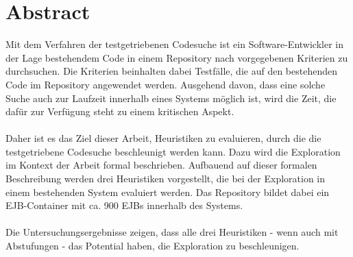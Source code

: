 \documentclass[a4paper,12pt]{book}
\begin{document}
\frontmatter

\section*{Abstract}
Mit dem Verfahren der testgetriebenen Codesuche ist ein Software-Entwickler in der Lage bestehendem Code in einem Repository nach vorgegebenen Kriterien zu durchsuchen. Die Kriterien beinhalten dabei Testfälle, die auf den bestehenden Code im Repository angewendet werden.  Ausgehend davon, dass eine solche Suche auch zur Laufzeit innerhalb eines Systems möglich ist, wird die Zeit, die dafür zur Verfügung steht zu einem kritischen Aspekt.
\\\\
Daher ist es das Ziel dieser Arbeit, Heuristiken zu evaluieren, durch die die testgetriebene Codesuche beschleunigt werden kann. Dazu wird die Exploration im Kontext der Arbeit formal beschrieben. Aufbauend auf dieser formalen Beschreibung werden drei Heuristiken vorgestellt, die bei der Exploration in einem bestehenden System evaluiert werden. Das Repository bildet dabei ein EJB-Container mit ca. 900 EJBs innerhalb des Systems. 
\\\\
Die Untersuchungsergebnisse zeigen, dass alle drei Heuristiken - wenn auch mit Abstufungen - das Potential haben, die Exploration zu beschleunigen.

%

\tableofcontents

{}
\listoffigures

{}
\listoftables

{}
\lstlistoflistings



\mainmatter










\appendix
{}
{}









%
%


%


\end{document}
